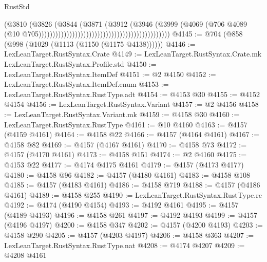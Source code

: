 \begin{lexlean}{RustStd}
\begin{coremodule}
                                                                              (@3810
                                                                                (@3826
                                                                                  (@3844
                                                                                    (@3871
                                                                                      (@3912
                                                                                        (@3946
                                                                                          (@3999
                                                                                            (@4069
                                                                                              (@706
                                                                                                @4089
                                                                                                (@10
                                                                                                  @705)))))))))))))))))))))))))))))))))))))))))))))))
@4145 := @704 (@858 (@998 (@1029 (@1113 (@1150 (@1175 @4138))))))
@4146 := LexLeanTarget.RustSyntax.Crate
@4149 := LexLeanTarget.RustSyntax.Crate.mk LexLeanTarget.RustSyntax.Profile.std
@4150 := LexLeanTarget.RustSyntax.ItemDef
@4151 := @2 @4150
@4152 := LexLeanTarget.RustSyntax.ItemDef.enum
@4153 := LexLeanTarget.RustSyntax.RustType.adt
@4154 := @4153 @30
@4155 := @4152 @4154
@4156 := LexLeanTarget.RustSyntax.Variant
@4157 := @2 @4156
@4158 := LexLeanTarget.RustSyntax.Variant.mk
@4159 := @4158 @30
@4160 := LexLeanTarget.RustSyntax.RustType
@4161 := @10 @4160
@4163 := @4157 (@4159 @4161)
@4164 := @4158 @22
@4166 := @4157 (@4164 @4161)
@4167 := @4158 @82
@4169 := @4157 (@4167 @4161)
@4170 := @4158 @73
@4172 := @4157 (@4170 @4161)
@4173 := @4158 @151
@4174 := @2 @4160
@4175 := @4153 @22
@4177 := @4174 @4175 @4161
@4179 := @4157 (@4173 @4177)
@4180 := @4158 @96
@4182 := @4157 (@4180 @4161)
@4183 := @4158 @108
@4185 := @4157 (@4183 @4161)
@4186 := @4158 @719
@4188 := @4157 (@4186 @4161)
@4189 := @4158 @255
@4190 := LexLeanTarget.RustSyntax.RustType.rc
@4192 := @4174 (@4190 @4154)
@4193 := @4192 @4161
@4195 := @4157 (@4189 @4193)
@4196 := @4158 @261
@4197 := @4192 @4193
@4199 := @4157 (@4196 @4197)
@4200 := @4158 @347
@4202 := @4157 (@4200 @4193)
@4203 := @4158 @290
@4205 := @4157 (@4203 @4197)
@4206 := @4158 @363
@4207 := LexLeanTarget.RustSyntax.RustType.nat
@4208 := @4174 @4207
@4209 := @4208 @4161

\end{coremodule}
\end{lexlean}
